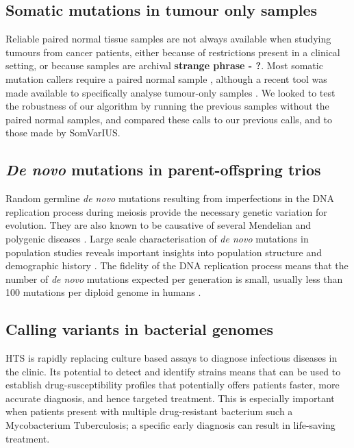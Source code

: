 \documentclass[notitlepage, twocolumn]{article}
\begin{document}
\subsection*{Somatic mutations in tumour only samples}

Reliable paired normal tissue samples are not always available when studying tumours from cancer patients, either because of restrictions present in a clinical setting, or because samples are archival {\bf strange phrase - ?}. Most somatic mutation callers require a paired normal sample \cite{mutect, somaticsniper, radia, strelka, varscan2}, although a recent tool was made available to specifically analyse tumour-only samples \cite{somvarius}. We looked to test the robustness of our algorithm by running the previous samples without the paired normal samples, and compared these calls to our previous calls, and to those made by SomVarIUS.

\subsection*{\emph{De novo} mutations in parent-offspring trios}

Random germline \emph{de novo} mutations resulting from imperfections in the DNA replication process during meiosis provide the necessary genetic variation for evolution. They are also known to be causative of several Mendelian and polygenic diseases \cite{denovos-disease, schizophrenia-denovo, id-denovo}. Large scale characterisation of \emph{de novo} mutations in population studies reveals important insights into population structure and demographic history \cite{denovo-pop}. The fidelity of the DNA replication process means that the number of \emph{de novo} mutations expected per generation is small, usually less than 100 mutations per diploid genome in humans \cite{denovo-rate}.

\subsection*{Calling variants in bacterial genomes}

HTS is rapidly replacing culture based assays to diagnose infectious diseases in the clinic. Its potential to detect and identify strains means that can be used to establish drug-susceptibility profiles that potentially offers patients faster, more accurate diagnosis, and hence targeted treatment. This is especially important when patients present with multiple drug-resistant bacterium such a Mycobacterium Tuberculosis; a specific early diagnosis can result in life-saving treatment.
\end{document}
